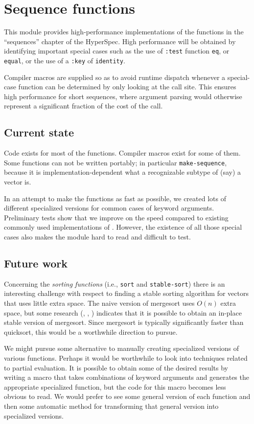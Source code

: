 \chapter{Sequence functions}

This module provides high-performance implementations of the
functions in the ``sequences'' chapter of the HyperSpec.  High
performance will be obtained by identifying important special cases
such as the use of \texttt{:test} function \texttt{eq}, or
\texttt{equal}, or the use of a \texttt{:key} of \texttt{identity}. 

Compiler macros are supplied so as to avoid runtime dispatch
whenever a special-case function can be determined by only looking at
the call site.  This ensures high performance for short sequences,
where argument parsing would otherwise represent a significant
fraction of the cost of the call.

\section{Current state}

Code exists for most of the functions.  Compiler macros exist for some
of them.  Some functions can not be written portably; in particular
\texttt{make-sequence}, because it is implementation-dependent what a
recognizable subtype of (say) a vector is.

In an attempt to make the functions as fast as possible, we created
lots of different specialized versions for common cases of keyword
arguments.  Preliminary tests show that we improve on the speed
compared to existing commonly used implementations of \cl{}.  However,
the existence of all those special cases also makes the module hard to
read and difficult to test.  

\section{Future work}

Concerning the \emph{sorting functions} (i.e., \texttt{sort} and
\texttt{stable-sort}) there is an interesting challenge with respect
to finding a stable sorting algorithm for vectors that uses little
extra space.  The naive version of mergesort uses $O(n)$ extra space,
but some research (\cite{Huang:1990:FSM:898863},
\cite{Huang:1988:PIM:42392.42403},
\cite{Katajainen:1996:PIM:642136.642138}) indicates that it is
possible to obtain an in-place stable version of mergesort.   Since
mergesort is typically significantly faster than quicksort, this would
be a worthwhile direction to pursue.

We might pursue some alternative to manually creating specialized
versions of various functions.  Perhaps it would be worthwhile to look
into techniques related to partial evaluation.  It is possible to
obtain some of the desired results by writing a macro that takes
combinations of keyword arguments and generates the appropriate
specialized function, but the code for this macro becomes less obvious
to read.  We would prefer to see some general version of each function
and then some automatic method for transforming that general version
into specialized versions.  


